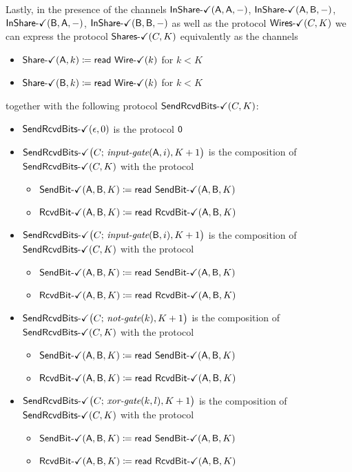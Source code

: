 \noindent Lastly, in the presence of the channels $\InShareOk(\A,\A,-)$, $\InShareOk(\A,\B,-)$, $\InShareOk(\B,\A,-)$, $\InShareOk(\B,\B,-)$ as well as the protocol $\WiresOk(C,K)$ we can express the protocol $\SharesOk(C,K)$ equivalently as the channels
\begin{itemize}
\item {\color{teal} $\ShareOk(\A,k) \coloneqq \read{\WireOk(k)}$ for $k < K$}
\item {\color{teal} $\ShareOk(\B,k) \coloneqq \read{\WireOk(k)}$ for $k < K$}
\end{itemize}
together with the following protocol $\SendRcvdBitsOk(C,K)$:

\begin{itemize}
\item $\SendRcvdBitsOk(\epsilon,0)$ is the protocol $\zero$

\item $\SendRcvdBitsOk\big(C; \, \inputgate(\A,i),K+1\big)$ is the composition of $\SendRcvdBitsOk(C,K)$ with the protocol
\begin{itemize}
\item {\color{teal} $\SendBitOk(\A,\B,K) \coloneqq \read{\SendBitOk(\A,\B,K)}$}
\item {\color{teal} $\RcvdBitOk(\A,\B,K) \coloneqq \read{\RcvdBitOk(\A,\B,K)}$}
\end{itemize}

\item $\SendRcvdBitsOk\big(C; \, \inputgate(\B,i),K+1\big)$ is the composition of $\SendRcvdBitsOk(C,K)$ with the protocol
\begin{itemize}
\item {\color{teal} $\SendBitOk(\A,\B,K) \coloneqq \read{\SendBitOk(\A,\B,K)}$}
\item {\color{teal} $\RcvdBitOk(\A,\B,K) \coloneqq \read{\RcvdBitOk(\A,\B,K)}$}
\end{itemize}

\item $\SendRcvdBitsOk\big(C; \, \notgate(k),K+1\big)$ is the composition of $\SendRcvdBitsOk(C,K)$ with the protocol
\begin{itemize}
\item {\color{teal} $\SendBitOk(\A,\B,K) \coloneqq \read{\SendBitOk(\A,\B,K)}$}
\item {\color{teal} $\RcvdBitOk(\A,\B,K) \coloneqq \read{\RcvdBitOk(\A,\B,K)}$}
\end{itemize}

\item $\SendRcvdBitsOk\big(C; \, \xorgate(k,l),K+1\big)$ is the composition of $\SendRcvdBitsOk(C,K)$ with the protocol
\begin{itemize}
\item {\color{teal} $\SendBitOk(\A,\B,K) \coloneqq \read{\SendBitOk(\A,\B,K)}$}
\item {\color{teal} $\RcvdBitOk(\A,\B,K) \coloneqq \read{\RcvdBitOk(\A,\B,K)}$}
\end{itemize}


\end{itemize}
